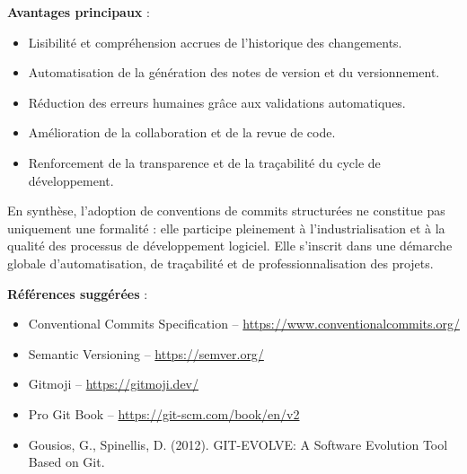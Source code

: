\textbf{Avantages principaux} :
\begin{itemize}
	\item Lisibilité et compréhension accrues de l’historique des changements.
	\item Automatisation de la génération des notes de version et du versionnement.
	\item Réduction des erreurs humaines grâce aux validations automatiques.
	\item Amélioration de la collaboration et de la revue de code.
	\item Renforcement de la transparence et de la traçabilité du cycle de développement.
\end{itemize}

En synthèse, l’adoption de conventions de commits structurées ne constitue pas uniquement une formalité : elle participe pleinement à l’industrialisation et à la qualité des processus de développement logiciel. Elle s’inscrit dans une démarche globale d’automatisation, de traçabilité et de professionnalisation des projets.

\textbf{Références suggérées} :
\begin{itemize}
	\item Conventional Commits Specification – \url{https://www.conventionalcommits.org/}
	\item Semantic Versioning – \url{https://semver.org/}
	\item Gitmoji – \url{https://gitmoji.dev/}
	\item Pro Git Book – \url{https://git-scm.com/book/en/v2}
	\item Gousios, G., Spinellis, D. (2012). GIT-EVOLVE: A Software Evolution Tool Based on Git.
\end{itemize}